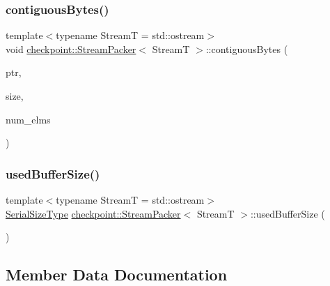 \subsubsection{\texorpdfstring{contiguous\+Bytes()}{contiguousBytes()}}
{\footnotesize\ttfamily template$<$typename StreamT  = std\+::ostream$>$ \\
void \hyperlink{structcheckpoint_1_1_stream_packer}{checkpoint\+::\+Stream\+Packer}$<$ StreamT $>$\+::contiguous\+Bytes (\begin{DoxyParamCaption}\item[{void $\ast$}]{ptr,  }\item[{\hyperlink{namespacecheckpoint_a083f6674da3f94c2901b18c6d238217c}{Serial\+Size\+Type}}]{size,  }\item[{\hyperlink{namespacecheckpoint_a083f6674da3f94c2901b18c6d238217c}{Serial\+Size\+Type}}]{num\+\_\+elms }\end{DoxyParamCaption})\hspace{0.3cm}{\ttfamily [inline]}}

\mbox{\label{structcheckpoint_1_1_stream_packer_abead4394e66814a9890348650125cdad}} 
\subsubsection{\texorpdfstring{used\+Buffer\+Size()}{usedBufferSize()}}
{\footnotesize\ttfamily template$<$typename StreamT  = std\+::ostream$>$ \\
\hyperlink{namespacecheckpoint_a083f6674da3f94c2901b18c6d238217c}{Serial\+Size\+Type} \hyperlink{structcheckpoint_1_1_stream_packer}{checkpoint\+::\+Stream\+Packer}$<$ StreamT $>$\+::used\+Buffer\+Size (\begin{DoxyParamCaption}{ }\end{DoxyParamCaption})\hspace{0.3cm}{\ttfamily [inline]}}



\subsection{Member Data Documentation}
\mbox{\label{structcheckpoint_1_1_stream_packer_aef2aecbc78b2eb2acec0e2fa6773f16a}} 

